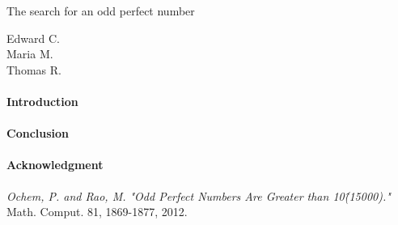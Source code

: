 \documentclass[12pt]{article}
\begin{document}
\begin{center}
\Large
The search for an odd perfect number
\end{center}

\begin{flushright}
Edward C.\\
\vspace{2 mm}
Maria M.\\
\vspace{2 mm}
Thomas R.\\
\end{flushright}

\paragraph*{Introduction}

\paragraph*{Conclusion}


\paragraph*{Acknowledgment}


\begin{thebibliography}{5}
\textit{Ochem, P. and Rao, M. "Odd Perfect Numbers Are Greater than 10\^(15000)."} Math. Comput. 81, 1869-1877, 2012.
\end{thebibliography}
\end{document}
